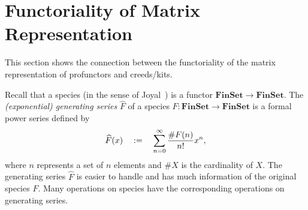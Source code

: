 \section{Functoriality of Matrix Representation}
This section shows the connection between the functoriality of the matrix representation of profunctors and creeds/kits.

\newcommand{\MatTrans}[1]{\mathcal{M}({#1})}
\newcommand{\rsem}[1]{(\!|{#1}|\!)}
\newcommand{\SProf}{\mathbf{SProf}}
\newcommand{\WRel}{\mathbf{WRel}}
\newcommand{\Real}{\mathbb{R}}



\tk{to do: define \( \SProf_\omega \)}


\newcommand{\FinSet}{\mathbf{FinSet}}

Recall that a species (in the sense of Joyal~\cite{Joyal1983?}) is a functor \( \FinSet \longrightarrow \FinSet \).
The \emph{(exponential) generating series} \( \widehat{F} \) of a species \( F \colon \FinSet \longrightarrow \FinSet \) is a formal power series defined by
\begin{equation*}
    \widehat{F}(x)
    \quad:=\quad
    \sum_{n = 0}^{\infty} \dfrac{\# F(n)}{n!} x^n,
\end{equation*}
where \( n \) represents a set of \( n \) elements and \( \# X \) is the cardinality of \( X \).
The generating series \( \widehat{F} \) is easier to handle and has much information of the original species \( F \).
Many operations on species have the corresponding operations on generating series.

